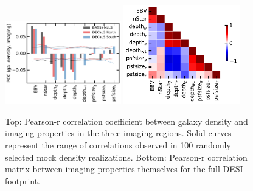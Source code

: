
\begin{figure}
    \includegraphics[width=0.45\textwidth]{figures/pcc.pdf} 
    \includegraphics[width=0.45\textwidth]{figures/pccx.pdf}     
    \caption{Top: Pearson-r correlation coefficient between galaxy density and imaging properties in the three imaging regions. Solid curves represent the range of correlations observed in 100 randomly selected mock density realizations. Bottom: Pearson-r correlation matrix between imaging properties themselves for the full DESI footprint.}
    \label{fig:pcc}
\end{figure}


